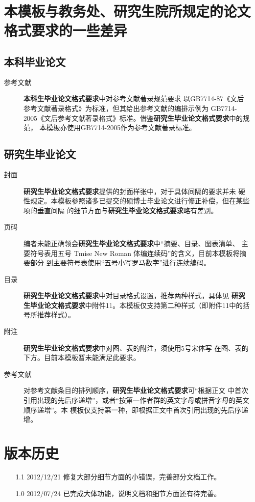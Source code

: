 \section{本模板与教务处、研究生院所规定的论文格式要求的一些差异}
\subsection{本科毕业论文}
\begin{description}
\item[参考文献] \textbf{本科生毕业论文格式要求}中对参考文献著录规范要求
以GB7714-87《文后参考文献著录格式》为标准，但其给出参考文献的编排示例为
GB7714-2005《文后参考文献著录格式》标准。借鉴\textbf{研究生毕业论文格式要求}中的规范，
本模板亦使用GB7714-2005作为参考文献著录标准。
\end{description}

\subsection{研究生毕业论文}
\begin{description}
\item[封面] \textbf{研究生毕业论文格式要求}提供的封面样张中，对于具体间隔的要求并未
硬性规定。本模板参照诸多已提交的硕博士毕业论文进行修正补偿，但在某些项的垂直间隔
的细节方面与\textbf{研究生毕业论文格式要求}略有差别。

\item[页码] 编者未能正确领会\textbf{研究生毕业论文格式要求}中“摘要、目录、图表清单、
主要符号表用{\heiti 五号 Tmise New Roman 体}编连续码”的含义，目前本模板将摘要部分
到主要符号表使用“五号小写罗马数字”进行连续编码。

\item[目录] \textbf{研究生毕业论文格式要求}中对目录格式设置，推荐两种样式，具体见
\textbf{研究生毕业论文格式要求}中附件11。本模板仅支持第二种样式（即附件11中的括号所推荐样式）。

\item[附注] \textbf{研究生毕业论文格式要求}中对图、表的附注，须使用{\heiti 5号宋体}写
在图、表的下方。目前本模板暂未能满足此要求。

\item[参考文献] 对参考文献条目的排列顺序，\textbf{研究生毕业论文格式要求}可“根据正文
中首次引用出现的先后序递增”，或者“按第一作者群的英文字母或拼音字母的英文顺序递增”。本
模板仅支持第一种，即根据正文中首次引用出现的先后序递增。
\end{description}

\section{版本历史}
\begin{itemize}
	\item[1.1] 2012/12/21 修复大部分细节方面的小错误，完善部分文档工作。
    \item[1.0] 2012/07/24 已完成大体功能，说明文档和细节方面还有待完善。
\end{itemize}
